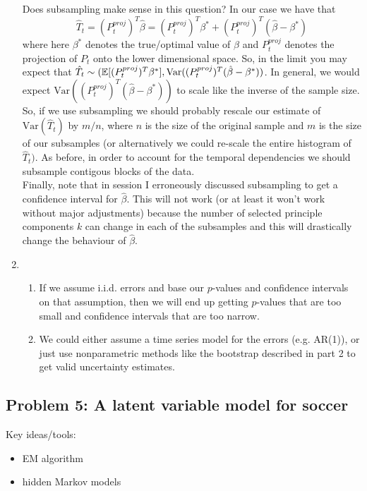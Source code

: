 \begin{enumerate}
Does subsampling make sense in this question? In our case we have that 
\[
\hat{T}_t = (P^{proj}_t)^T\hat{\beta} = (P^{proj}_t)^T\beta^* + (P^{proj}_t)^T(\hat{\beta}  - \beta^*) 
\]
where here $\beta^*$ denotes the true/optimal value of $\beta$ and $P^{proj}_t$ denotes the projection of $P_t$ onto the lower dimensional space. So, in the limit you may expect that $\hat{T}_t  \sim (\mathbb{E}[(P^{proj}_t)^T\beta^* ],   \text{Var}((P^{proj}_t)^T(\hat{\beta}- \beta^*))$. In general, we would expect $\text{Var}((P^{proj}_t)^T(\hat{\beta}- \beta^*))$ to scale like the inverse of the sample size. So, if we use subsampling we should probably rescale our estimate of  $\text{Var}(\hat{T}_t)$ by $m/n$, where $n$ is the size of the original sample and $m$ is the size of our subsamples (or alternatively we could re-scale the entire histogram of $\hat{T}_t)$. As before, in order to account for the temporal dependencies we should subsample contigous blocks of the data.\\

Finally, note that in session I erroneously discussed subsampling to get a confidence interval for $\hat{\beta}$. This will not work (or at least it won't work without major adjustments) because the number of selected principle components $k$ can change in each of the subsamples and this will drastically change the behaviour of $\hat{\beta}$.  


\item \begin{enumerate}
\item If we assume i.i.d. errors and base our $p$-values and confidence intervals on that assumption, then we will end up getting $p$-values that are too small and confidence intervals that are too narrow. 
				
\item We could either assume a time series model for the errors (e.g. AR(1)), or just use nonparametric methods like the bootstrap described in part 2 to get valid uncertainty estimates.
\end{enumerate}

\end{enumerate}


\subsection*{Problem 5: A latent variable model for soccer}
Key ideas/tools:
\begin{itemize}
	\item EM algorithm
	\item hidden Markov models
\end{itemize}

